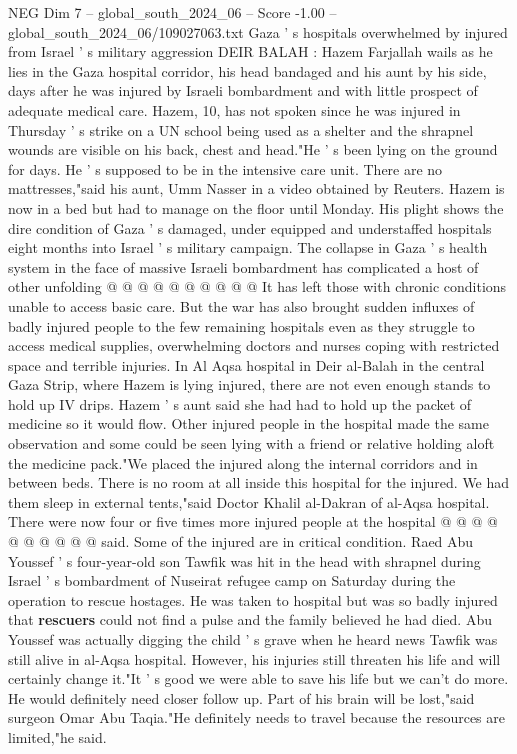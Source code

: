 \begin{textsample}{NEG Dim 7 – global\_south\_2024\_06 – Score -1.00 – global\_south\_2024\_06/109027063.txt}  \label{ex:f7_neg_214}
Gaza ' s hospitals overwhelmed by injured from Israel ' s military aggression DEIR BALAH : Hazem Farjallah wails as he lies in the Gaza hospital corridor, his head bandaged and his aunt by his side, days after he was injured by Israeli bombardment and with little prospect of adequate medical care.
Hazem, 10, has not spoken since he was injured in Thursday ' s strike on a UN school being used as a shelter and the shrapnel wounds are visible on his back, chest and head."He ' s been lying on the ground for days.
He ' s supposed to be in the intensive care unit.
There are no mattresses,"said his aunt, Umm Nasser in a video obtained by Reuters.
Hazem is now in a bed but had to manage on the floor until Monday.
His plight shows the dire condition of Gaza ' s damaged, under equipped and understaffed hospitals eight months into Israel ' s military campaign.
The collapse in Gaza ' s health system in the face of massive Israeli bombardment has complicated a host of other unfolding @ @ @ @ @ @ @ @ @ @ It has left those with chronic conditions unable to access basic care.
But the war has also brought sudden influxes of badly injured people to the few remaining hospitals even as they struggle to access medical supplies, overwhelming doctors and nurses coping with restricted space and terrible injuries.
In Al Aqsa hospital in Deir al-Balah in the central Gaza Strip, where Hazem is lying injured, there are not even enough stands to hold up IV drips.
Hazem ' s aunt said she had had to hold up the packet of medicine so it would flow.
Other injured people in the hospital made the same observation and some could be seen lying with a friend or relative holding aloft the medicine pack."We placed the injured along the internal corridors and in between beds.
There is no room at all inside this hospital for the injured.
We had them sleep in external tents,"said Doctor Khalil al-Dakran of al-Aqsa hospital.
There were now four or five times more injured people at the hospital @ @ @ @ @ @ @ @ @ @ said.
Some of the injured are in critical condition.
Raed Abu Youssef ' s four-year-old son Tawfik was hit in the head with shrapnel during Israel ' s bombardment of Nuseirat refugee camp on Saturday during the operation to rescue hostages.
He was taken to hospital but was so badly injured that \textbf{rescuers} could not find a pulse and the family believed he had died.
Abu Youssef was actually digging the child ' s grave when he heard news Tawfik was still alive in al-Aqsa hospital.
However, his injuries still threaten his life and will certainly change it."It ' s good we were able to save his life but we can't do more.
He would definitely need closer follow up.
Part of his brain will be lost,"said surgeon Omar Abu Taqia."He definitely needs to travel because the resources are limited,"he said.

\end{textsample}
